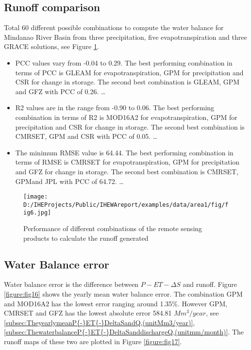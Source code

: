\documentclass[oneside,openany]{article}%
\begin{document}
\subsection{Runoff comparison}%
\label{subsec:Runoffcomparison}%
Total 60 different possible combinations to compute the water balance for Mindanao River Basin from three precipitation, five evapotranspiration and three GRACE solutions, see Figure \ref{figure:fig15}.%
\linebreak%
\begin{itemize}%
\item%
PCC values vary from {-}0.04 to 0.29. The best performing combination in terms of PCC is GLEAM for evapotranspiration, GPM for precipitation and CSR for change in storage. The second best combination is GLEAM, GPM and GFZ with PCC of 0.26.%
\ldots%
\item%
R2 values are in the range from {-}0.90 to 0.06. The best performing combination in terms of R2 is MOD16A2 for evapotranspiration, GPM for precipitation and CSR for change in storage. The second best combination is CMRSET, GPM and CSR with PCC of 0.05.%
\ldots%
\item%
The minimum RMSE value is 64.44. The best performing combination in terms of RMSE is CMRSET for evapotranspiration, GPM for precipitation and GFZ for change in storage. The second best combination is CMRSET, GPMand JPL with PCC of 64.72.%
\ldots%
\end{itemize}%


\begin{figure}[H]%
\centering%
\texttt{[image: D:/IHEProjects/Public/IHEWAreport/examples/data/area1/fig/fig6.jpg]}%
\caption{Performance of different combinations of the remote sensing products to calculate the runoff generated}%
\label{figure:fig15}%
\end{figure}

%
\subsection{Water Balance error}%
\label{subsec:WaterBalanceerror}%
Water balance error is the difference between $P-ET-\Delta S$ and runoff. Figure \ref{figure:fig16} shows the yearly mean water balance error. The combination GPM and MOD16A2 has the lowest error ranging around 1.35\%. However GPM, CMRSET and GFZ has the lowest absolute error 584.81 $Mm^3/year$, see \ref{subsec:TheyearlymeanP{-}ET{-}DeltaSandQ,(unitMm3/year)}, \ref{subsec:ThewaterbalanceP{-}ET{-}DeltaSanddischargeQ,(unitmm/month)}. The runoff maps of these two are plotted in Figure \ref{figure:fig17}.%
\linebreak%
\end{document}
